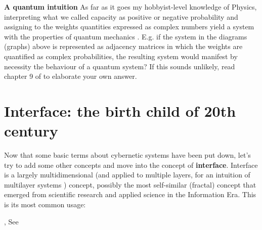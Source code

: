 \documentclass[14pt]{extarticle}
\begin{document}
\newline
\hspace*{15mm}\textbf{A quantum intuition}
\newline
As far as it goes my hobbyist-level knowledge of Physics, interpreting what we called capacity as positive or negative probability and assigning to the weights quantities expressed as complex numbers yield a system with the properties of quantum mechanics \cite{Aaronson10.5555/2487754}. E.g. if the system in the diagrams (graphs) above is represented as adjacency matrices in which the weights are quantified as complex probabilities, the resulting system would manifest by necessity the behaviour of a quantum system? If this sounds unlikely, read chapter 9 of \cite{Aaronson10.5555/2487754} to elaborate your own answer.

\section*{Interface: the birth child of 20th century}
\label{sec:interface}%

\hspace*{15mm}Now that some basic terms about cybernetic systems have been put down, let’s try to add some other concepts and move into the concept of \textbf{interface}. Interface is a largely multidimensional (and applied to multiple layers, for an intuition of multilayer systems \cite{Shchurov2015,Grassi2021,Thakare2021,Thakare20212}) concept, possibly the most self-similar (fractal) concept that emerged from scientific research and applied science in the Information Era. This is its most common usage:
\begin{center}
\begin{minipage}[t]{0.75\linewidth}
, See \cite{ETYMOinterface}
\end{minipage}
\end{center}
\end{document}
